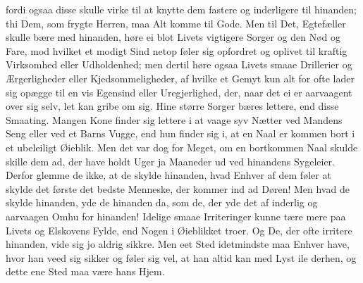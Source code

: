 \documentclass[12pt,a4paper]{book}
\newcommand{\apage}[1]{\marginnote{\footnotesize\textit{[#1]}}}
\begin{document}
fordi ogsaa disse skulle virke til at knytte dem fastere og inderligere
til hinanden; thi Dem, som frygte Herren, maa Alt komme til Gode. Men
til Det, Egtefæller skulle bære med hinanden, høre ei blot Livets
vigtigere Sorger og den Nød og Fare, mod hvilket et modigt Sind netop
føler sig opfordret og oplivet til kraftig Virksomhed eller Udholdenhed;
men dertil høre ogsaa Livets smaae Drillerier og Ærgerligheder eller
Kjedsommeligheder, af hvilke et Gemyt kun alt for ofte lader sig opægge
til en vis Egensind eller Uregjerlighed, der, naar det ei er aarvaagent
over sig selv, let kan gribe om sig. Hine større Sorger bæres lettere,
end disse Smaating. Mangen Kone finder sig lettere i at vaage syv Nætter
ved Mandens Seng eller ved et Barns Vugge, end hun finder sig i, at en
Naal er kommen bort i et ubeleiligt Øieblik. Men det var dog for Meget,
om en bortkommen Naal skulde skille dem ad, der have holdt Uger ja
Maaneder ud ved hinandens Sygeleier. Derfor glemme de ikke, at de skylde
hinanden, hvad Enhver af dem føler at skylde det første det bedste
Menneske, der kommer ind ad Døren! Men hvad de skylde hinanden, yde de
hinanden da, som de, der yde det af inderlig og aarvaagen Omhu for
hinanden! Idelige smaae Irriteringer kunne tære mere paa Livets og
Elskovens Fylde, end Nogen i \apage{98} Øieblikket troer. Og De, der ofte irritere
hinanden, vide sig jo aldrig sikkre. Men eet Sted idetmindste maa Enhver
have, hvor han veed sig sikker og føler sig vel, at han altid kan med
Lyst ile derhen, og dette ene Sted maa være hans Hjem.
\end{document}
